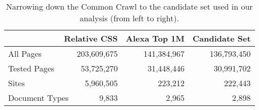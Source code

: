 \begin{table}[t]
    \caption{Narrowing down the Common Crawl to the candidate set used in our analysis (from left to right).}
    \label{rpo:tab:dataset_stats}
    \centering
    \footnotesize
    \begin{tabular}{lrrr}
    \toprule
    \multicolumn{2}{r}{\textbf{Relative CSS}} & \textbf{Alexa Top 1M} & \textbf{Candidate Set} \\
    \midrule
    All Pages & 203,609,675 & 141,384,967 & 136,793,450 \\
    Tested Pages & 53,725,270 & 31,448,446 & 30,991,702 \\
    Sites & 5,960,505 & 223,212 & 222,443 \\
    Document Types & 9,833 & 2,965 & 2,898 \\
    \bottomrule
    \end{tabular}
\end{table}
